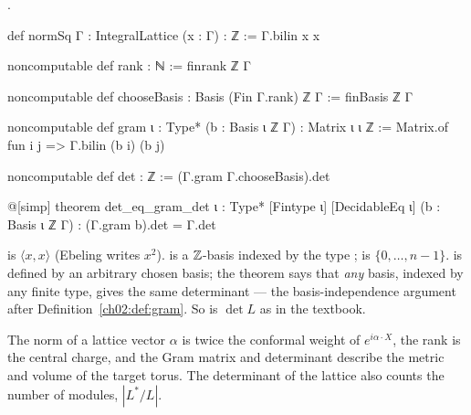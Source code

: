 \begin{definition}\label{ch02:def:ebenorm}
.
\end{definition}
\begin{leancode}
def normSq {Γ : IntegralLattice} (x : Γ) : ℤ := Γ.bilin x x

noncomputable def rank : ℕ := finrank ℤ Γ

noncomputable def chooseBasis : Basis (Fin Γ.rank) ℤ Γ := finBasis ℤ Γ

noncomputable def gram {ι : Type*} (b : Basis ι ℤ Γ) : Matrix ι ι ℤ :=
  Matrix.of fun i j => Γ.bilin (b i) (b j)

noncomputable def det : ℤ := (Γ.gram Γ.chooseBasis).det

@[simp] theorem det_eq_gram_det {ι : Type*} [Fintype ι] [DecidableEq ι] (b : Basis ι ℤ Γ) :
    (Γ.gram b).det = Γ.det
\end{leancode}
\begin{dictionary}
 is $\langle x,x\rangle$ (Ebeling writes $x^2$).   is a
${\mathbb{Z}}$-basis indexed by the type ;  is $\{0,\dots,n-1\}$.   is
defined by an arbitrary chosen basis; the theorem  says that \emph{any}
basis, indexed by any finite type, gives the same determinant --- the basis-independence argument
after Definition~\ref{ch02:def:gram}.  So  is $\det L$ as in the textbook.
\end{dictionary}
\begin{physics}
The norm of a lattice vector $\alpha$ is twice the conformal weight of $e^{i\alpha\cdot X}$, the rank is the central charge, and the Gram matrix and determinant describe the metric and volume of the target torus. The determinant of the lattice also counts the number of modules, $|L^*/L|$.
\end{physics}

